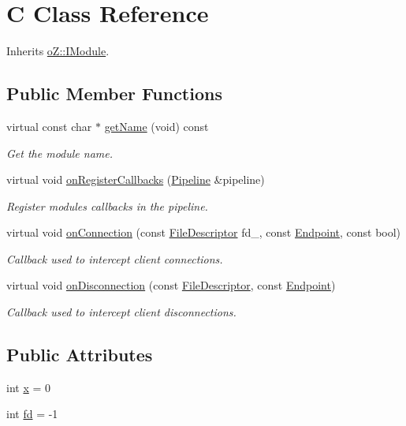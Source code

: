\hypertarget{class_c}{}\section{C Class Reference}
\label{class_c}


Inherits \mbox{\hyperlink{classo_z_1_1_i_module}{o\+Z\+::\+I\+Module}}.

\subsection*{Public Member Functions}
\begin{DoxyCompactItemize}
\item 
virtual const char $\ast$ \mbox{\hyperlink{class_c_ad5f4b90909e9c14fc2601adc54ffdfa6}{get\+Name}} (void) const
\begin{DoxyCompactList}\small\item\em Get the module name. \end{DoxyCompactList}\item 
virtual void \mbox{\hyperlink{class_c_ae55c5d0571aadf7e48cae4d1e4fcf591}{on\+Register\+Callbacks}} (\mbox{\hyperlink{classo_z_1_1_pipeline}{Pipeline}} \&pipeline)
\begin{DoxyCompactList}\small\item\em Register module\textquotesingle{}s callbacks in the pipeline. \end{DoxyCompactList}\item 
virtual void \mbox{\hyperlink{class_c_a9d2de0b00320ee2011d7e326346d00cb}{on\+Connection}} (const \mbox{\hyperlink{namespaceo_z_acbb8d05709257b6414b3979597f88c0c}{File\+Descriptor}} fd\+\_\+, const \mbox{\hyperlink{classo_z_1_1_endpoint}{Endpoint}}, const bool)
\begin{DoxyCompactList}\small\item\em Callback used to intercept client connections. \end{DoxyCompactList}\item 
virtual void \mbox{\hyperlink{class_c_ab9bef2875c2d19d674aa592f63a21bc1}{on\+Disconnection}} (const \mbox{\hyperlink{namespaceo_z_acbb8d05709257b6414b3979597f88c0c}{File\+Descriptor}}, const \mbox{\hyperlink{classo_z_1_1_endpoint}{Endpoint}})
\begin{DoxyCompactList}\small\item\em Callback used to intercept client disconnections. \end{DoxyCompactList}\end{DoxyCompactItemize}
\subsection*{Public Attributes}
\begin{DoxyCompactItemize}
\item 
int \mbox{\hyperlink{class_c_a644bc4405a602578b65e83d317a2f3eb}{x}} = 0
\item 
int \mbox{\hyperlink{class_c_a7d63b9c907f2a1200cd3e173cee9751e}{fd}} = -\/1
\end{DoxyCompactItemize}
